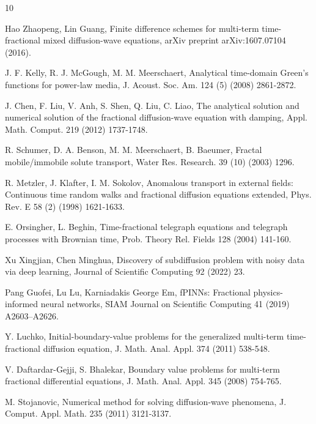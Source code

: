 \documentclass[11pt]{article}
\begin{document}
\begin{thebibliography}{10}
\begin{footnotesize}







   Hao Zhaopeng,  Lin Guang, Finite difference schemes for multi-term time-fractional mixed diffusion-wave equations,  arXiv preprint arXiv:1607.07104 (2016).

   J. F. Kelly,  R. J. McGough,  M. M.  Meerschaert,  Analytical time-domain Green's functions for
power-law media,  J. Acoust. Soc. Am. 124 (5) (2008) 2861-2872.

J. Chen, F. Liu,   V. Anh,  S. Shen,  Q. Liu,  C. Liao,  The analytical solution and numerical solution of the fractional diffusion-wave equation with damping, Appl. Math. Comput. 219 (2012)  1737-1748.

  R. Schumer,  D. A. Benson,  M. M. Meerschaert,  B. Baeumer,   Fractal mobile/immobile solute transport,  Water Res. Research. 39 (10) (2003) 1296.

 R. Metzler,  J. Klafter,  I. M.  Sokolov,  Anomalous transport in external fields: Continuous time random walks and fractional diffusion equations extended,  Phys. Rev. E 58 (2) (1998) 1621-1633.


E. Orsingher,  L. Beghin, Time-fractional telegraph equations and telegraph processes with Brownian time, Prob. Theory Rel. Fields  128 (2004) 141-160.

 Xu Xingjian, Chen Minghua, Discovery of subdiffusion problem with noisy data via deep learning, Journal of Scientific Computing 92 (2022) 23.

 Pang Guofei, Lu Lu, Karniadakis George Em, fPINNs: Fractional physics-informed neural networks, SIAM Journal on Scientific Computing 41 (2019) A2603--A2626.

 Y. Luchko,   Initial-boundary-value problems for the generalized multi-term time-fractional diffusion equation, J. Math. Anal. Appl. 374  (2011) 538-548.

V. Daftardar-Gejji,  S. Bhalekar,   Boundary value problems for multi-term fractional differential equations, J. Math. Anal. Appl. 345 (2008) 754-765.

 M. Stojanovic, Numerical method for solving diffusion-wave phenomena, J. Comput. Appl.
Math. 235 (2011) 3121-3137.



\end{footnotesize}
\end{thebibliography}
\end{document}
